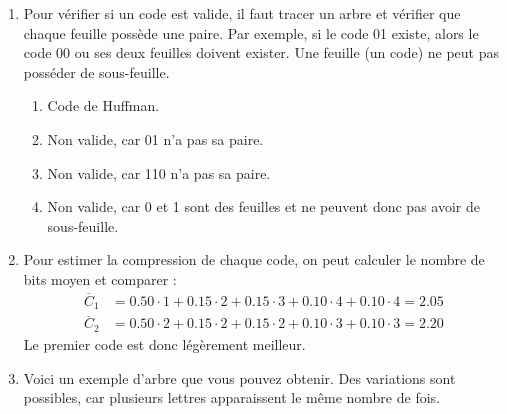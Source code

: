 \documentclass [a4paper, 11pt] {article}
\begin{document}
    \begin{reponse}
        \begin{enumerate}
            \item Pour vérifier si un code est valide, il faut tracer un arbre et vérifier que chaque feuille possède une paire. Par exemple, si le code 01 existe, alors le code 00 ou ses deux feuilles doivent exister. Une feuille (un code) ne peut pas posséder de sous-feuille.
            \begin{enumerate}
                \item Code de Huffman.
                \item Non valide, car 01 n'a pas sa paire.
                \item Non valide, car 110 n'a pas sa paire.
                \item Non valide, car 0 et 1 sont des feuilles et ne peuvent donc pas avoir de sous-feuille.
            \end{enumerate}
            \item Pour estimer la compression de chaque code, on peut calculer le nombre de bits moyen et comparer :
            \begin{align*}
                \overline{C}_1 &= 0.50 \cdot 1 + 0.15 \cdot 2 + 0.15 \cdot 3 + 0.10 \cdot 4 + 0.10 \cdot 4 = 2.05\\
                \overline{C}_2 &= 0.50 \cdot 2 + 0.15 \cdot 2 + 0.15 \cdot 2 + 0.10 \cdot 3 + 0.10 \cdot 3 = 2.20
            \end{align*}
            Le premier code est donc légèrement meilleur.
            \item Voici un exemple d'arbre que vous pouvez obtenir. Des variations sont possibles, car plusieurs lettres apparaissent le même nombre de fois.
            \begin{center}
\end{center}
\end{enumerate}
\end{reponse}
\end{document}
